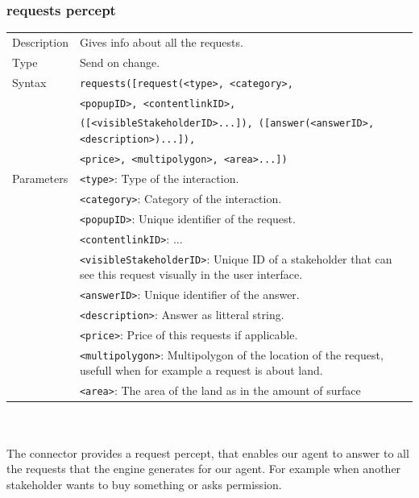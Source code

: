 	\subsubsection*{requests percept}
		\begin{small}
			\begin{tabular}{p{2cm}p{9cm}}
				Description 	& Gives info about all the requests.\\
				Type 		& Send on change.\\
				Syntax 	& \verb|requests([request(<type>, <category>, |\\
					 	& \verb|<popupID>, <contentlinkID>, |\\
					 	& \verb|([<visibleStakeholderID>...]), ([answer(<answerID>, <description>)...]), |\\
					 	& \verb|<price>, <multipolygon>, <area>...]) |\\
				Parameters 	& \verb|<type>|: Type of the interaction.\\
						& \verb|<category>|: Category of the interaction.\\
						& \verb|<popupID>|:  Unique identifier of the request.\\
						& \verb|<contentlinkID>|: ...\\
						& \verb|<visibleStakeholderID>|: Unique ID of a stakeholder that can see this request visually in the user interface.\\
						& \verb|<answerID>|: Unique identifier of the answer.\\
						& \verb|<description>|: Answer as litteral string.\\
						& \verb|<price>|: Price of this requests if applicable.\\
						& \verb|<multipolygon>|: Multipolygon of the location of the request, usefull when for example a request is about land.\\
						& \verb|<area>|: The area of the land as in the amount of surface\\
			\end{tabular}
		\end{small}
	\\
	\\The connector provides a request percept, that enables our agent to answer to all the requests that the engine generates for our agent. For example when another stakeholder wants to buy something or asks permission.\\

